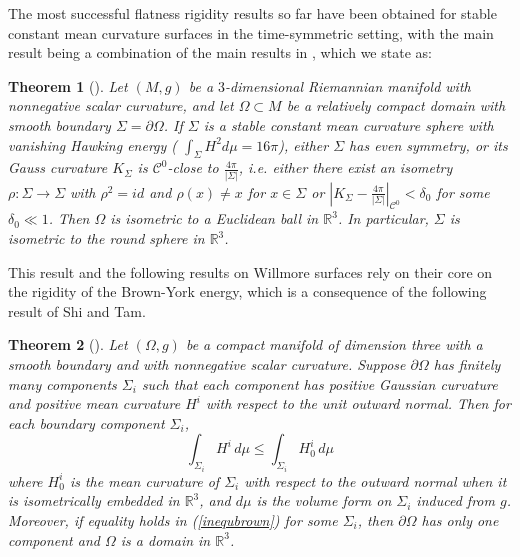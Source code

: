 \documentclass[12pt,a4paper]{amsart}
\theoremstyle{plain}
\newtheorem{theorem}{Theorem}[section]
\theoremstyle{definition}
\begin{document}
The most successful flatness rigidity results so far have been obtained for stable constant mean curvature surfaces in the time-symmetric setting, with the main result being a combination of the main results in \cite{shi2019uniqueness, sun2017rigidity}, which we state as:
\begin{theorem}[{\cite[Theorem 2, Theorem 1]{shi2019uniqueness, sun2017rigidity}}]
  Let \((M, g)\) be a $3$-dimensional Riemannian manifold with nonnegative scalar curvature, and let \( \Omega \subset M \) be a relatively  compact domain with smooth boundary \( \Sigma = \partial \Omega \). If \( \Sigma \) is a stable constant mean curvature  sphere with vanishing Hawking energy ( $\int_{\Sigma } H^2 d\mu =16 \pi   $),  either $\Sigma$ has  even symmetry, or its Gauss curvature  \( K_{\Sigma} \) is \( \mathcal{C}^0 \)-close to \( \frac{4\pi}{|\Sigma|} \), i.e. either  there exist an isometry $\rho :\Sigma \to \Sigma $ with $\rho^2 =id$ and $\rho(x)\neq x$ for $x \in \Sigma$ or \(
|K_{\Sigma} -\frac{4\pi}{|\Sigma|}|_{\mathcal{C}^0} < \delta_0
\) for some \( \delta_0 \ll 1 \).
 Then \( \Omega \) is isometric to a Euclidean ball in \( \mathbb{R}^3 \). In particular, \( \Sigma \) is isometric to the round sphere in \( \mathbb{R}^3 \).
\end{theorem}
This result and the following results on  Willmore surfaces rely on their core  on the rigidity of the Brown-York energy, which is a consequence of the following result of Shi and Tam.
\begin{theorem}[{\cite[Theorem 1]{shi2002positive}}]\label{rigiditybrown}
    Let \((\Omega, g)\) be a compact manifold of dimension three with a smooth boundary and with nonnegative scalar curvature. Suppose \(\partial \Omega\) has finitely many components \(\Sigma_i\) such that each component has positive Gaussian curvature and positive mean curvature \(H^i \) with respect to the unit outward normal. Then for each boundary component \(\Sigma_i\),
\begin{equation}\label{inequbrown}
    \int_{\Sigma_i} H^i \, d\mu \leq \int_{\Sigma_i} H_0^{i} \, d\mu
\end{equation}
where \(H_0^{i}\) is the mean curvature of \(\Sigma_i\) with respect to the outward normal when it is isometrically embedded in \(\mathbb{R}^3\), and \(d\mu \) is the volume form on \(\Sigma_i\) induced from \(g\). Moreover, if equality holds in (\ref{inequbrown}) for some \(\Sigma_i\), then \(\partial \Omega\) has only one component and \(\Omega\) is a domain in \(\mathbb{R}^3\).
\end{theorem}
\end{document}
